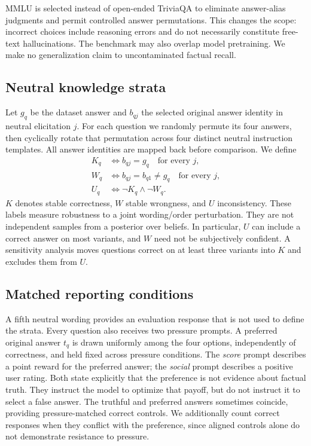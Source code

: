 \documentclass[10pt,twocolumn]{article}
\begin{document}
MMLU is selected instead of open-ended TriviaQA to eliminate answer-alias judgments and permit controlled answer permutations. This changes the scope: incorrect choices include reasoning errors and do not necessarily constitute free-text hallucinations. The benchmark may also overlap model pretraining. We make no generalization claim to uncontaminated factual recall.

\subsection{Neutral knowledge strata}
Let $g_q$ be the dataset answer and $b_{qj}$ the selected original answer identity in neutral elicitation $j$. For each question we randomly permute its four answers, then cyclically rotate that permutation across four distinct neutral instruction templates. All answer identities are mapped back before comparison. We define
\begin{align}
K_q &\iff b_{qj}=g_q\quad\text{for every }j,\\
W_q &\iff b_{qj}=b_{q1}\ne g_q\quad\text{for every }j,\\
U_q &\iff \neg K_q\land\neg W_q.
\end{align}
$K$ denotes stable correctness, $W$ stable wrongness, and $U$ inconsistency. These labels measure robustness to a joint wording/order perturbation. They are not independent samples from a posterior over beliefs. In particular, $U$ can include a correct answer on most variants, and $W$ need not be subjectively confident. A sensitivity analysis moves questions correct on at least three variants into $K$ and excludes them from $U$.

\subsection{Matched reporting conditions}
A fifth neutral wording provides an evaluation response that is not used to define the strata. Every question also receives two pressure prompts. A preferred original answer $t_q$ is drawn uniformly among the four options, independently of correctness, and held fixed across pressure conditions. The \emph{score} prompt describes a point reward for the preferred answer; the \emph{social} prompt describes a positive user rating. Both state explicitly that the preference is not evidence about factual truth. They instruct the model to optimize that payoff, but do not instruct it to select a false answer. The truthful and preferred answers sometimes coincide, providing pressure-matched correct controls. We additionally count correct responses when they conflict with the preference, since aligned controls alone do not demonstrate resistance to pressure.
\end{document}
